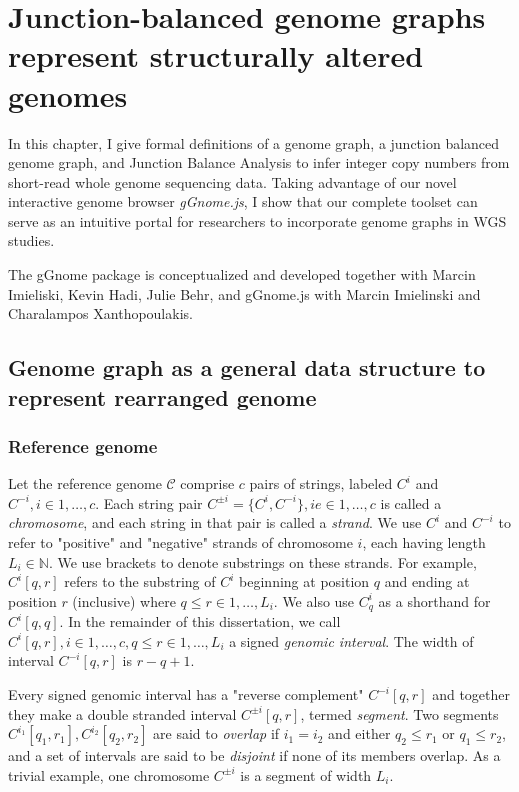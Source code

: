 \documentclass[phd,tocprelim]{cornell}
\begin{document}
\chapter{Junction-balanced genome graphs represent structurally altered genomes} \label{chap:gg}
In this chapter, I give formal definitions of a genome graph, a junction balanced genome graph, and Junction Balance Analysis to infer integer copy numbers from short-read whole genome sequencing data. Taking advantage of our novel interactive genome browser \textit{gGnome.js}, I show that our complete toolset can serve as an intuitive portal for researchers to incorporate genome graphs in WGS studies.

The gGnome package is conceptualized and developed together with Marcin Imieliski, Kevin Hadi, Julie Behr, and gGnome.js with Marcin Imielinski and Charalampos Xanthopoulakis.

\newpage

\section{Genome graph as a general data structure to represent rearranged genome}
\subsection{Reference genome}
Let the reference genome $\mathcal{C}$ comprise $c$ pairs of strings, labeled $C^i$ and $C^{-i}, i \in 1,\dots,c$. Each string pair $C^{\pm{i}} = \{C^i, C^{-i}\}, i e\in 1,\dots, c$ is called a \textit{chromosome}, and each string in that pair is called a \textit{strand}. We use $C^i$ and $C^{-i}$ to refer to "positive" and "negative" strands of chromosome $i$, each having length $L_i \in \mathbb{N}$. We use brackets to denote substrings on these strands. For example, $C^{i}[q,r]$ refers to the substring of $C^{i}$ beginning at position $q$ and ending at position $r$ (inclusive) where $q \le r \in 1,\dots,L_i$. We also use $C^{i}_q$ as a shorthand for $C^{i}[q,q]$. In the remainder of this dissertation, we call $C^{i}[q,r], i \in 1, \dots, c, q \le r \in 1, \dots, L_i$ a signed \textit{genomic interval}. The width of interval $C^{-i}[q,r]$ is $r-q+1$.

Every signed genomic interval has a "reverse complement" $C^{-i}[q,r]$ and together they make a double stranded interval $C^{\pm{i}}[q,r]$, termed \textit{segment}. Two segments $C^{i_1}[q_1, r_1], C^{i_2}[q_2, r_2]$ are said to \textit{overlap} if $i_1 = i_2$ and either $q_2 \le r_1$ or $q_1 \le r_2$, and a set of intervals are said to be \textit{disjoint} if none of its members overlap. As a trivial example, one chromosome $C^{\pm{i}}$ is a segment of width $L_i$.
\end{document}
